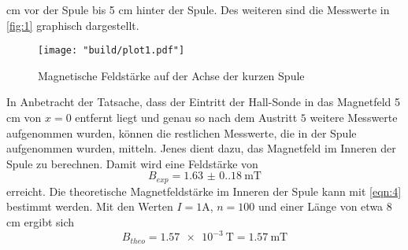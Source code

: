 \unit{\centi\meter} vor der Spule bis 5 \unit{\centi\meter} hinter der Spule.
Des weiteren sind die Messwerte in \autoref{fig:1} graphisch dargestellt.
\begin{figure}
    \caption{Magnetische Feldstärke auf der Achse der kurzen Spule}
    \label{fig:1}
    \centering
    \texttt{[image: "build/plot1.pdf"]}
\end{figure}
In Anbetracht der Tatsache, dass der Eintritt der Hall-Sonde in das Magnetfeld
5 \unit{\centi\meter} von $x = 0$ entfernt liegt und genau so nach dem Austritt
$5$ weitere Messwerte aufgenommen wurden, können die restlichen Messwerte, 
die in der Spule aufgenommen wurden, mitteln. Jenes dient dazu, das Magnetfeld 
im Inneren der Spule zu berechnen. Damit wird eine Feldstärke von 
\begin{equation*}
    B_{exp} = \qty{1.63(0.18)}{\milli\tesla}
\end{equation*}
erreicht. Die theoretische Magnetfeldstärke im Inneren der Spule kann mit
\autoref{eqn:4} bestimmt werden. Mit den Werten $I = 1 \unit{\ampere}$,
$n = 100$ und einer Länge von etwa 8 \unit{\centi\meter}
ergibt sich 
\begin{equation*}
    B_{theo} = \qty{1.57e-3}{\tesla} = \qty{1.57}{\milli\tesla}
\end{equation*}

